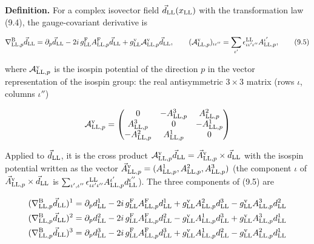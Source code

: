 \documentclass[
  10pt,
]{article}
\begin{document}
\textbf{Definition.} For a complex isovector field
\(\vec d_{\rm LL}(x_{\rm LL})\) with the transformation law (9.4), the
gauge-covariant derivative is

\[\nabla^{\rm B}_{{\rm LL},p}\vec d_{\rm LL}=\partial_p\vec d_{\rm LL}-2i\,g^{\rm F}_{\rm LL}A^{\rm F}_{{\rm LL},p}\vec d_{\rm LL}+g^{\rm v}_{\rm LL}\mathcal A^{\rm v}_{{\rm LL},p}\vec d_{\rm LL},\qquad(\mathcal A^{\rm v}_{{\rm LL},p})_{\iota\iota''}=\sum_{\iota'}\epsilon^{\rm LL}_{\iota\iota'\iota''}A^{\iota'}_{{\rm LL},p},\tag{9.5}\]

where \(\mathcal A^{\rm v}_{{\rm LL},p}\) is the isospin potential of
the direction \(p\) in the vector representation of the isospin group:
the real antisymmetric \(3\times3\) matrix (rows \(\iota\), columns
\(\iota''\))

\[\mathcal A^{\rm v}_{{\rm LL},p}=\begin{pmatrix}0&-A^3_{{\rm LL},p}&A^2_{{\rm LL},p}\\A^3_{{\rm LL},p}&0&-A^1_{{\rm LL},p}\\-A^2_{{\rm LL},p}&A^1_{{\rm LL},p}&0\end{pmatrix}\]

Applied to \(\vec d_{\rm LL}\), it is the cross product
\(\mathcal A^{\rm v}_{{\rm LL},p}\vec d_{\rm LL}=\vec A^{\rm v}_{{\rm LL},p}\times\vec d_{\rm LL}\)
with the isospin potential written as the vector
\(\vec A^{\rm v}_{{\rm LL},p}=(A^1_{{\rm LL},p},A^2_{{\rm LL},p},A^3_{{\rm LL},p})\)
(the component \(\iota\) of
\(\vec A^{\rm v}_{{\rm LL},p}\times\vec d_{\rm LL}\) is
\(\sum_{\iota',\iota''}\epsilon^{\rm LL}_{\iota\iota'\iota''}A^{\iota'}_{{\rm LL},p}d^{\iota''}_{\rm LL}\)).
The three components of (9.5) are

\[\begin{aligned}(\nabla^{\rm B}_{{\rm LL},p}\vec d_{\rm LL})^1&=\partial_pd^1_{\rm LL}-2i\,g^{\rm F}_{\rm LL}A^{\rm F}_{{\rm LL},p}d^1_{\rm LL}+g^{\rm v}_{\rm LL}A^2_{{\rm LL},p}d^3_{\rm LL}-g^{\rm v}_{\rm LL}A^3_{{\rm LL},p}d^2_{\rm LL}\\
(\nabla^{\rm B}_{{\rm LL},p}\vec d_{\rm LL})^2&=\partial_pd^2_{\rm LL}-2i\,g^{\rm F}_{\rm LL}A^{\rm F}_{{\rm LL},p}d^2_{\rm LL}-g^{\rm v}_{\rm LL}A^1_{{\rm LL},p}d^3_{\rm LL}+g^{\rm v}_{\rm LL}A^3_{{\rm LL},p}d^1_{\rm LL}\\
(\nabla^{\rm B}_{{\rm LL},p}\vec d_{\rm LL})^3&=\partial_pd^3_{\rm LL}-2i\,g^{\rm F}_{\rm LL}A^{\rm F}_{{\rm LL},p}d^3_{\rm LL}+g^{\rm v}_{\rm LL}A^1_{{\rm LL},p}d^2_{\rm LL}-g^{\rm v}_{\rm LL}A^2_{{\rm LL},p}d^1_{\rm LL}\end{aligned}\]
\end{document}
